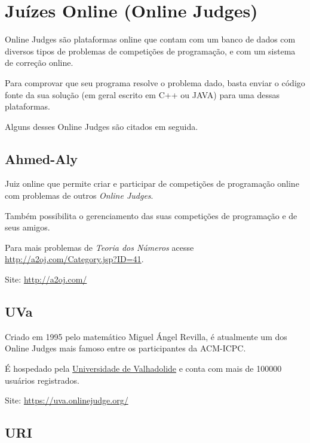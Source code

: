 
\chapter{Juízes Online (Online Judges)} %

\label{AppendixB} %

Online Judges são plataformas online que contam com um banco de dados com diversos tipos de problemas de competições de programação, e com um sistema de correção online.

Para comprovar que seu programa resolve o problema dado, basta enviar o código fonte da sua solução (em geral escrito em C++ ou JAVA) para uma dessas plataformas.

Alguns desses Online Judges são citados em seguida.


\section{Ahmed-Aly}

Juiz online que permite criar e participar de competições de programação online com problemas de outros \textit{Online Judges}.

Também possibilita o gerenciamento das suas competições de programação e de seus amigos.

Para mais problemas de \textit{Teoria dos Números} acesse \href{http://a2oj.com/Category.jsp?ID=41}{http://a2oj.com/Category.jsp?ID=41}.

Site: \href{http://a2oj.com/}{http://a2oj.com/}


\section{UVa} 
	
Criado em 1995 pelo matemático Miguel Ángel Revilla, é atualmente um dos Online Judges mais famoso entre os participantes da ACM-ICPC.

É hospedado pela \href{http://www.uva.es/export/sites/uva/}{Universidade de Valhadolide} e conta com mais de 100000 usuários registrados.

Site: \href{https://uva.onlinejudge.org/}{https://uva.onlinejudge.org/}


\section{URI}

